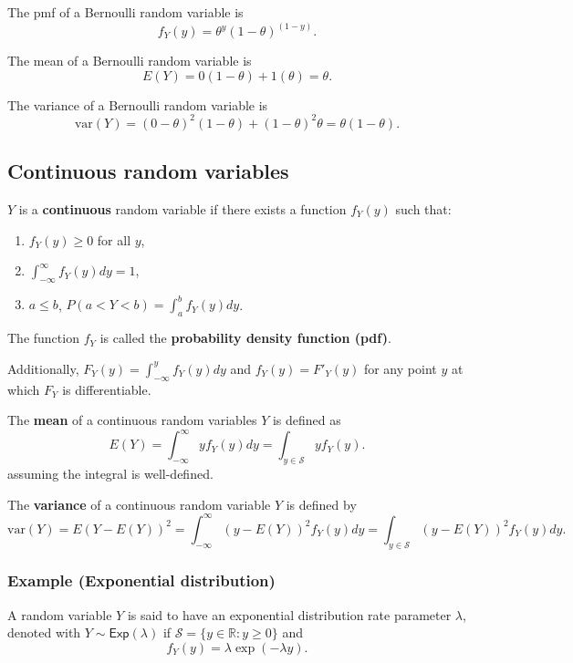 \documentclass[
]{book}
\providecommand{\tightlist}{%
  \setlength{\itemsep}{0pt}\setlength{\parskip}{0pt}}
\theoremstyle{definition}
\theoremstyle{definition}
\theoremstyle{definition}
\theoremstyle{definition}
\theoremstyle{remark}
\begin{document}
The pmf of a Bernoulli random variable is
\[f_Y(y) = \theta^y (1-\theta)^{(1-y)}.\]

The mean of a Bernoulli random variable is
\[E(Y)=0(1-\theta )+1(\theta)=\theta.\]

The variance of a Bernoulli random variable is \[\mathrm{var}(Y)=(0-\theta)^2(1-\theta)+(1-\theta)^2\theta = \theta(1-\theta).\]

\hypertarget{continuous-random-variables}{%
\subsection{Continuous random variables}\label{continuous-random-variables}}

\(Y\) is a \textbf{continuous} random variable if there exists a function \(f_Y (y)\) such that:

\begin{enumerate}
\def\labelenumi{\arabic{enumi}.}
\tightlist
\item
  \(f_Y (y)\geq 0\) for all \(y\),
\item
  \(\int_{-\infty}^\infty f_Y (y) dy = 1\),
\item
  \(a\leq b\), \(P(a<Y<b)=\int_a^b f_Y (y) dy\).
\end{enumerate}

The function \(f_Y\) is called the \textbf{probability density function (pdf)}.

Additionally, \(F_Y (y)=\int_{-\infty}^y f_Y (y) dy\) and \(f_Y (y)=F'_Y(y)\) for any point \(y\) at which \(F_Y\) is differentiable.

The \textbf{mean} of a continuous random variables \(Y\) is defined as
\[
E(Y) =
\int_{-\infty}^{\infty} y f_Y(y)  dy =
\int_{y\in\mathcal{S}} y f_Y(y).
\]
assuming the integral is well-defined.

The \textbf{variance} of a continuous random variable \(Y\) is defined by
\[
\mathrm{var}(Y)=
E(Y-E(Y))^2=\int_{-\infty}^{\infty} (y - E(Y))^2 f_Y(y)  dy =
\int_{y\in\mathcal{S}} (y - E(Y))^2 f_Y(y) dy.
\]

\hypertarget{example-exponential-distribution}{%
\subsubsection{Example (Exponential distribution)}\label{example-exponential-distribution}}

A random variable \(Y\) is said to have an exponential distribution rate parameter \(\lambda\), denoted with \(Y \sim \mathsf{Exp}(\lambda)\) if \(\mathcal{S} = \{y\in \mathbb{R}:y\geq 0\}\) and
\[f_Y(y)=\lambda\exp(-\lambda y).\]
\end{document}
